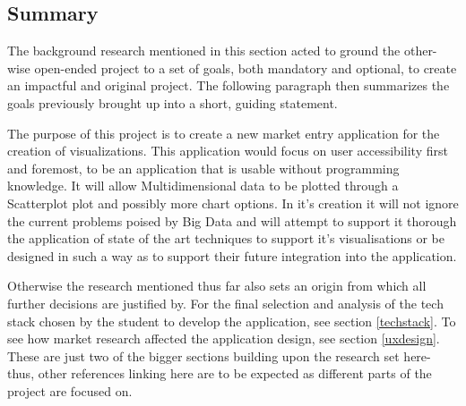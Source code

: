 \subsection{Summary} \label{ressummary}

The background research mentioned in this section acted to ground the other-wise open-ended project to a set of goals, both mandatory and optional, to create an impactful and original project. The following paragraph then summarizes the goals previously brought up into a short, guiding statement.

\begin{displayquote}
    The purpose of this project is to create a new market entry application for the creation of visualizations. This application would focus on user accessibility first and foremost, to be an application that is usable without programming knowledge. It will allow Multidimensional data to be plotted through a Scatterplot plot and possibly more chart options. In it's creation it will not ignore the current problems poised by Big Data and will attempt to support it thorough the application of state of the art techniques to support it's visualisations or be designed in such a way as to support their future integration into the application.
\end{displayquote}


Otherwise the research mentioned thus far also sets an origin from which all further decisions are justified by. For the final selection and analysis of the tech stack chosen by the student to develop the application, see section \ref{techstack}. To see how market research affected the application design, see section \ref{uxdesign}. These are just two of the bigger sections building upon the research set here- thus, other references linking here are to be expected as different parts of the project are focused on.


